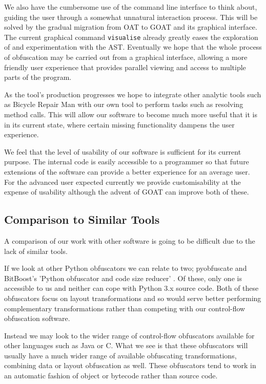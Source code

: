 \documentclass[twoside,a4paper]{report}
\begin{document}
We also have the cumbersome use of the command line interface to think about, guiding the user through a somewhat unnatural interaction process. This will be
solved by the gradual migration from OAT to GOAT and its graphical interface. The current graphical command \texttt{visualise} already greatly eases the
exploration of and experimentation with the AST. Eventually we hope that the whole process of obfuscation may be carried out from a graphical interface,
allowing a more friendly user experience that provides parallel viewing and access to multiple parts of the program.

As the tool's production progresses we hope to integrate other analytic tools such as Bicycle Repair Man \cite{bikerepair} with our own tool to
perform tasks such as resolving method calls. This will allow our software to become much more useful that it is in its current state, where certain
missing functionality dampens the user experience.

We feel that the level of usability of our software is sufficient for its current purpose. The internal code is easily accessible to a programmer so that
future extensions of the software can provide a better experience for an average user. For the advanced user expected currently we provide customisability
at the expense of usability although the advent of GOAT can improve both of these.

\subsection{Comparison to Similar Tools}

A comparison of our work with other software is going to be difficult due to the lack of similar tools.

If we look at other Python obfuscators we can relate to two; pyobfuscate \cite{pyobf} and BitBoost's
'Python obfuscator and code size reducer' \cite{bitboost}. Of these, only one is accessible to us and
neither can cope with Python 3.x source code. Both of these obfuscators focus on layout transformations
and so would serve better performing complementary transformations rather than competing with our
control-flow obfuscation software.

Instead we may look to the wider range of control-flow obfuscators available for other languages such as
Java or C. What we see is that these obfuscators will usually have a much wider range of available
obfuscating transformations, combining data or layout obfuscation as well. These obfuscators tend to
work in an automatic fashion of object or bytecode rather than source code.
\end{document}
